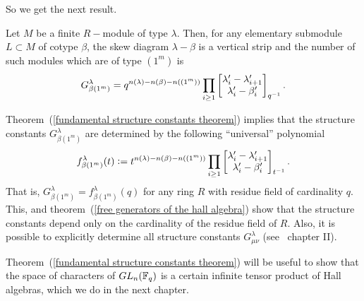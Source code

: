 So we get the next result.
\begin{dang}
    \begin{theorem}\label{fundamental structure constants theorem}\cite{macdonald1998symmetric}
        Let $M$ be a finite $R-$module of type $\lambda$. Then, for any elementary submodule $L\subset M$ of cotype $\beta$, the skew diagram $\lambda-\beta$ is a vertical strip and the number of such modules which are of type $(1^m)$ is
        \[
        G_{\beta(1^m)}^\lambda=q^{n(\lambda)-n(\beta)-n((1^m))}\prod_{i\geq1}\begin{bmatrix} \lambda_i^\prime-\lambda_{i+1}^\prime\\\lambda_i^\prime-\beta_i^\prime\end{bmatrix}_{q^{-1}}.
        \]
    \end{theorem}
\end{dang}
Theorem~(\ref{fundamental structure constants theorem}) implies that the structure constants $G_{\beta(1^m)}^\lambda$ are determined by the following ``universal'' polynomial
\begin{equation}
    f_{\beta(1^m)}^\lambda(t) \bydef t^{n(\lambda)-n(\beta)-n((1^m))}\prod_{i\geq1}\gausspol{\lambda_i^\prime-\lambda_{i+1}^\prime}{\lambda_i^\prime-\beta_i^\prime}_{t^{-1}}.
\end{equation}
That is, $G_{\beta(1^m)}^\lambda= f_{\beta(1^m)}^\lambda(q)$ for any ring $R$ with residue field of cardinality $q$. This, and theorem~(\ref{free generators of the hall algebra}) show that the structure constants depend only on the cardinality of the residue field of $R$. Also, it is possible to explicitly determine all structure constants $G_{\mu\nu}^\lambda$ (see~\cite{macdonald1998symmetric} chapter II).\par
Theorem~(\ref{fundamental structure constants theorem}) will be useful to show that the space of characters of $GL_n(\mathbb{F}_q)$ is a certain infinite tensor product of Hall algebras, which we do in the next chapter.
